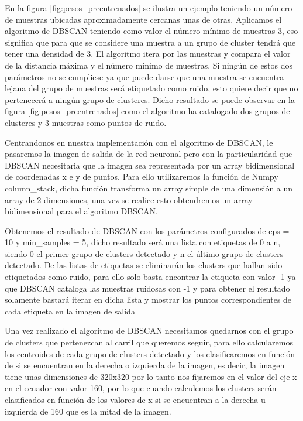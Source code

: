 En la figura \ref{fig:pesos_preentrenados} se ilustra un ejemplo teniendo un número de muestras ubicadas aproximadamente cercanas unas de otras. Aplicamos el algoritmo de DBSCAN 
teniendo como valor el número mínimo de muestras 3, eso significa que para que se considere una muestra a un grupo de cluster tendrá que tener una densidad de 3. El algoritmo itera por
las muestras y compara el valor de la distancia máxima y el número mínimo de muestras. 
Si ningún de estos dos parámetros no se cumpliese ya que puede darse que una muestra se encuentra lejana del grupo de muestras será etiquetado como ruido, esto quiere decir
que no pertenecerá a ningún grupo de clusteres. Dicho resultado se puede observar en la figura \ref{fig:pesos_preentrenados} como el algoritmo ha catalogado dos grupos de clusteres y 3 muestras
como puntos de ruido. 
\break

Centrandonos en nuestra implementación con el algoritmo de DBSCAN, le pasaremos la imagen de salida de la red neuronal pero con la particularidad que DBSCAN necesitaria que la imagen sea
representada por un array bidimensional de coordenadas x e y de puntos. Para ello utilizaremos la función de Numpy column\_stack, dicha función transforma un array simple de una dimensión a
un array de 2 dimensiones, una vez se realice esto obtendremos un array bidimensional para el algoritmo DBSCAN.\newline

Obtenemos el resultado de DBSCAN con los parámetros configurados de eps = 10 y min\_samples = 5, dicho resultado será una lista con etiquetas de 0 a n, siendo 0 el primer grupo de clusters detectado y 
n el último grupo de clusters detectado. De las listas de etiquetas se eliminarán los clusters que hallan sido etiquetados como ruido, para ello solo basta encontrar la etiqueta con valor -1 ya que
DBSCAN cataloga las muestras ruidosas con -1 y para obtener el resultado solamente bastará iterar en dicha lista y mostrar los puntos correspondientes de cada etiqueta en la imagen de salida


Una vez realizado el algoritmo de DBSCAN necesitamos quedarnos con el grupo de clusters que pertenezcan al carril que queremos seguir, para ello calcularemos los centroides de cada
grupo de clusters detectado y los clasificaremos en función de si se encuentran en la derecha o izquierda de la imagen, es decir, la imagen tiene unas dimensiones de 320x320 por lo tanto 
nos fijaremos en el valor del eje x en el ecuador con valor 160, por lo que cuando calculemos los clusters serán clasificados en función de los valores de x si se encuentran a la derecha u izquierda de 160 
que es la mitad de la imagen. 

